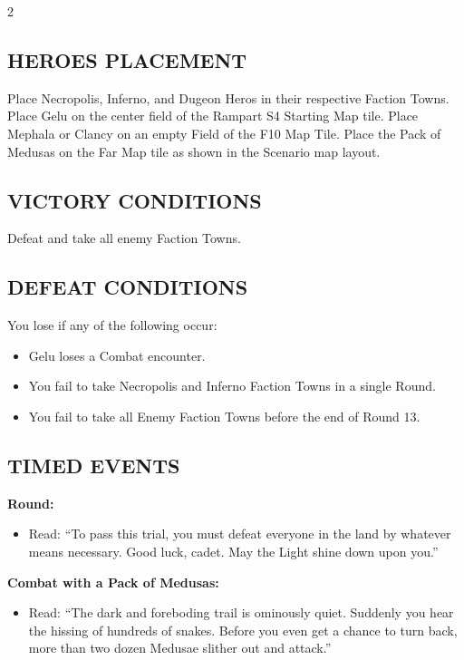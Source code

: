 \begin{multicols*}{2}
\subsection*{\MakeUppercase{Heroes Placement}}

Place Necropolis, Inferno, and Dugeon Heros in their respective Faction Towns.
Place Gelu on the center field of the Rampart S4 Starting Map tile.
Place Mephala or Clancy on an empty Field of the F10 Map Tile.
Place the Pack of Medusas on the Far Map tile as shown in the Scenario map layout.

\subsection*{\MakeUppercase{Victory Conditions}}

Defeat and take all enemy Faction Towns.

\subsection*{\MakeUppercase{Defeat Conditions}}

You lose if any of the following occur:
\begin{itemize}
  \item Gelu loses a Combat encounter.
  \item You fail to take Necropolis and Inferno Faction Towns in a single Round.
  \item You fail to take all Enemy Faction Towns before the end of Round 13.
\end{itemize}

\subsection*{\MakeUppercase{Timed Events}}

\textbf{ Round:}
\begin{itemize}
  \item Read: ``To pass this trial, you must defeat everyone in the land by whatever means necessary.
    Good luck, cadet.
    May the Light shine down upon you.''
  \end{itemize}

\textbf{Combat with a Pack of Medusas:}
\begin{itemize}
  \item Read: ``The dark and foreboding trail is ominously quiet.
    Suddenly you hear the hissing of hundreds of snakes.
    Before you even get a chance to turn back, more than two dozen Medusae slither out and attack.''
\end{itemize}


\end{multicols*}
